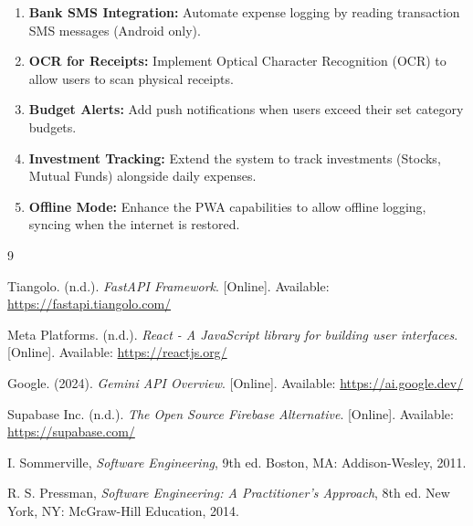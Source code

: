 \begin{enumerate}
    \item \textbf{Bank SMS Integration:} Automate expense logging by reading transaction SMS messages (Android only).
    \item \textbf{OCR for Receipts:} Implement Optical Character Recognition (OCR) to allow users to scan physical receipts.
    \item \textbf{Budget Alerts:} Add push notifications when users exceed their set category budgets.
    \item \textbf{Investment Tracking:} Extend the system to track investments (Stocks, Mutual Funds) alongside daily expenses.
    \item \textbf{Offline Mode:} Enhance the PWA capabilities to allow offline logging, syncing when the internet is restored.
\end{enumerate}

\renewcommand{\bibname}{References}
\begin{thebibliography}{9}

Tiangolo. (n.d.). \textit{FastAPI Framework}. [Online]. Available: \url{https://fastapi.tiangolo.com/}

Meta Platforms. (n.d.). \textit{React - A JavaScript library for building user interfaces}. [Online]. Available: \url{https://reactjs.org/}

Google. (2024). \textit{Gemini API Overview}. [Online]. Available: \url{https://ai.google.dev/}

Supabase Inc. (n.d.). \textit{The Open Source Firebase Alternative}. [Online]. Available: \url{https://supabase.com/}

I. Sommerville, \textit{Software Engineering}, 9th ed. Boston, MA: Addison-Wesley, 2011.

R. S. Pressman, \textit{Software Engineering: A Practitioner's Approach}, 8th ed. New York, NY: McGraw-Hill Education, 2014.

\end{thebibliography}
